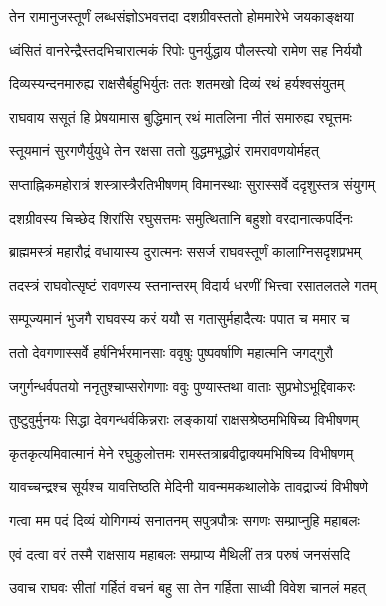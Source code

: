\twolineshloka
{तेन रामानुजस्तूर्णं लब्धसंज्ञोऽभवत्तदा}
{दशग्रीवस्ततो होममारेभे जयकाङ्क्षया}%

\twolineshloka
{ध्वंसितं वानरेन्द्रैस्तदभिचारात्मकं रिपोः}
{पुनर्युद्धाय पौलस्त्यो रामेण सह निर्ययौ}%

\twolineshloka
{दिव्यस्यन्दनमारुह्य राक्षसैर्बहुभिर्युतः}
{ततः शतमखो दिव्यं रथं हर्यश्वसंयुतम्}%

\twolineshloka
{राघवाय ससूतं हि प्रेषयामास बुद्धिमान्}
{रथं मातलिना नीतं समारुह्य रघूत्तमः}%

\twolineshloka
{स्तूयमानं सुरगणैर्युयुधे तेन रक्षसा}
{ततो युद्धमभूद्धोरं रामरावणयोर्महत्}%

\twolineshloka
{सप्ताह्निकमहोरात्रं शस्त्रास्त्रैरतिभीषणम्}
{विमानस्थाः सुरास्सर्वे ददृशुस्तत्र संयुगम्}%

\twolineshloka
{दशग्रीवस्य चिच्छेद शिरांसि रघुसत्तमः}
{समुत्थितानि बहुशो वरदानात्कपर्दिनः}%

\twolineshloka
{ब्राह्ममस्त्रं महारौद्रं वधायास्य दुरात्मनः}
{ससर्ज राघवस्तूर्णं कालाग्निसदृशप्रभम्}%

\twolineshloka
{तदस्त्रं राघवोत्सृष्टं रावणस्य स्तनान्तरम्}
{विदार्य धरणीं भित्त्वा रसातलतले गतम्}%

\twolineshloka
{सम्पूज्यमानं भुजगै राघवस्य करं ययौ}
{स गतासुर्महादैत्यः पपात च ममार च}%

\twolineshloka
{ततो देवगणास्सर्वे हर्षनिर्भरमानसाः}
{ववृषुः पुष्पवर्षाणि महात्मनि जगद्गुरौ}%

\twolineshloka
{जगुर्गन्धर्वपतयो ननृतुश्चाप्सरोगणाः}
{ववुः पुण्यास्तथा वाताः सुप्रभोऽभूद्दिवाकरः}%

\twolineshloka
{तुष्टुवुर्मुनयः सिद्धा देवगन्धर्वकिन्नराः}
{लङ्कायां राक्षसश्रेष्ठमभिषिच्य विभीषणम्}%

\twolineshloka
{कृतकृत्यमिवात्मानं मेने रघुकुलोत्तमः}
{रामस्तत्राब्रवीद्वाक्यमभिषिच्य विभीषणम्}%


\twolineshloka
{यावच्चन्द्रश्च सूर्यश्च यावत्तिष्ठति मेदिनी}
{यावन्ममकथालोके तावद्राज्यं विभीषणे}%

\twolineshloka
{गत्वा मम पदं दिव्यं योगिगम्यं सनातनम्}
{सपुत्रपौत्रः सगणः सम्प्राप्नुहि महाबलः}%


\twolineshloka
{एवं दत्वा वरं तस्मै राक्षसाय महाबलः}
{सम्प्राप्य मैथिलीं तत्र परुषं जनसंसदि}%

\twolineshloka
{उवाच राघवः सीतां गर्हितं वचनं बहु}
{सा तेन गर्हिता साध्वी विवेश चानलं महत्}%

